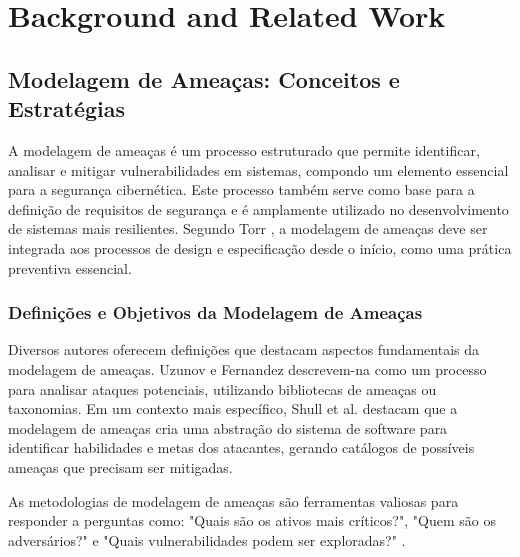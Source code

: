 
%

\chapter{Background and Related Work}
\label{cha:background}

\glsresetall

\section{Modelagem de Ameaças: Conceitos e Estratégias}
\label{sec:threat_modeling}

A modelagem de ameaças é um processo estruturado que permite identificar,
analisar e mitigar vulnerabilidades em sistemas, compondo um elemento essencial
para a segurança cibernética. Este processo também serve como base para a
definição de requisitos de segurança e é amplamente utilizado no desenvolvimento
de sistemas mais resilientes. Segundo Torr
\cite{DemystifyingTheThreatModelingProcess}, a modelagem de ameaças deve ser
integrada aos processos de design e especificação desde o início, como uma
prática preventiva essencial.

\subsection{Definições e Objetivos da Modelagem de Ameaças}

Diversos autores oferecem definições que destacam aspectos fundamentais da
modelagem de ameaças. Uzunov e Fernandez
\cite{ThreatModelingASystematicLiteratureReview} descrevem-na como um processo
para analisar ataques potenciais, utilizando bibliotecas de ameaças ou
taxonomias. Em um contexto mais específico, Shull et al.
\cite{EvaluationofCompetingThreatModeling} destacam que a modelagem de ameaças
cria uma abstração do sistema de software para identificar habilidades e metas
dos atacantes, gerando catálogos de possíveis ameaças que precisam ser
mitigadas.

As metodologias de modelagem de ameaças são ferramentas valiosas para responder
a perguntas como: "Quais são os ativos mais críticos?", "Quem são os
adversários?" e "Quais vulnerabilidades podem ser exploradas?"
\cite{ThreatModelingAsABasisForSecurityRequirements}.

